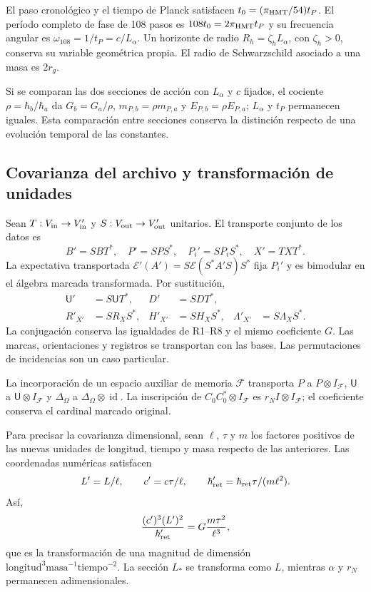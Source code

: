 El paso cronológico y el tiempo de Planck satisfacen
$t_0=(\pi_{\rm HMT}/54)t_P$. El período completo de fase de 108 pasos es
$108t_0=2\pi_{\rm HMT}t_P$ y su frecuencia angular es
$\omega_{108}=1/t_P=c/L_\alpha$. Un horizonte de radio
$R_h=\zeta_hL_\alpha$, con $\zeta_h>0$, conserva su variable geométrica
propia. El radio de Schwarzschild asociado a una masa es $2r_g$.

Si se comparan las dos secciones de acción con $L_\alpha$ y $c$ fijados,
el cociente $\rho=\hbar_b/\hbar_a$ da
$G_b=G_a/\rho$, $m_{P,b}=\rho m_{P,a}$ y
$E_{P,b}=\rho E_{P,a}$; $L_\alpha$ y $t_P$ permanecen iguales.
Esta comparación entre secciones conserva la distinción respecto de una
evolución temporal de las constantes.

\subsection{Covarianza del archivo y transformación de unidades}

Sean \(T:V_{\rm in}\to V'_{\rm in}\) y
\(S:V_{\rm out}\to V'_{\rm out}\) unitarios. El transporte conjunto
de los datos es
\[
 B'=SBT^*,\quad P'=SPS^*,\quad P_i'=SP_iS^*,\quad X'=TXT^*.
\]
La expectativa transportada
\(\mathcal E'(A')=S\mathcal E(S^*A'S)S^*\) fija \(P_i'\)
y es bimodular en el álgebra marcada transformada. Por sustitución,
\begin{align*}
 \mathsf U'&=S\mathsf UT^*,&D'&=SDT^*,\\
 R'_{X'}&=SR_XS^*,&H'_{X'}&=SH_XS^*,&
 \Lambda'_{X'}&=S\Lambda_XS^*.
\end{align*}
La conjugación conserva las igualdades de R1--R8 y el mismo coeficiente
\(G\). Las marcas, orientaciones y registros se transportan con las
bases. Las permutaciones de incidencias son un caso particular.

La incorporación de un espacio auxiliar de memoria \(\mathcal F\)
transporta \(P\) a \(P\otimes I_{\mathcal F}\),
\(\mathsf U\) a \(\mathsf U\otimes I_{\mathcal F}\) y
\(\Delta_\Omega\) a \(\Delta_\Omega\otimes\operatorname{id}\).
La inscripción de \(C_0C_0^*\otimes I_{\mathcal F}\) es
\(r_N I\otimes I_{\mathcal F}\); el coeficiente conserva el cardinal
marcado original.

Para precisar la covarianza dimensional, sean \(\ell\), \(\tau\) y
\(m\) los factores positivos de las nuevas unidades de longitud, tiempo
y masa respecto de las anteriores. Las coordenadas numéricas satisfacen
\[
 L'=L/\ell,\qquad c'=c\tau/\ell,\qquad
 \hbar'_{\rm ret}=\hbar_{\rm ret}\tau/(m\ell^2).
\]
Así,
\[
 \frac{(c')^3(L')^2}{\hbar'_{\rm ret}}
 =G\frac{m\tau^2}{\ell^3},
\]
que es la transformación de una magnitud de dimensión
\(\mathrm{longitud}^3\mathrm{masa}^{-1}\mathrm{tiempo}^{-2}\).
La sección \(L_*\) se transforma como \(L\), mientras \(\alpha\)
y \(r_N\) permanecen adimensionales.

